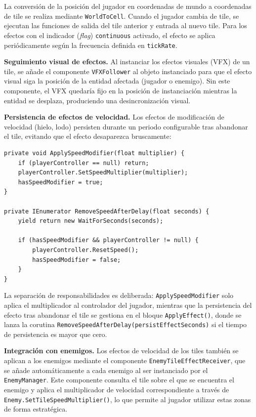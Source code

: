 La conversión de la posición del jugador en coordenadas de mundo a coordenadas de tile se realiza mediante \texttt{WorldToCell}. Cuando el jugador cambia de tile, se ejecutan las funciones de salida del tile anterior y entrada al nuevo tile. Para los efectos con el indicador (\textit{flag}) \texttt{continuous} activado, el efecto se aplica periódicamente según la frecuencia definida en \texttt{tickRate}.

\textbf{Seguimiento visual de efectos.} Al instanciar los efectos visuales (VFX) de un tile, se añade el componente \texttt{VFXFollower} al objeto instanciado para que el efecto visual siga la posición de la entidad afectada (jugador o enemigo). Sin este componente, el VFX quedaría fijo en la posición de instanciación mientras la entidad se desplaza, produciendo una desincronización visual.

\textbf{Persistencia de efectos de velocidad.} Los efectos de modificación de velocidad (hielo, lodo) persisten durante un periodo configurable tras abandonar el tile, evitando que el efecto desaparezca bruscamente:

\begin{lstlisting}
private void ApplySpeedModifier(float multiplier) {
    if (playerController == null) return;
    playerController.SetSpeedMultiplier(multiplier);
    hasSpeedModifier = true;
}

private IEnumerator RemoveSpeedAfterDelay(float seconds) {
    yield return new WaitForSeconds(seconds);
    
    if (hasSpeedModifier && playerController != null) {
        playerController.ResetSpeed();
        hasSpeedModifier = false;
    }
}
\end{lstlisting}


La separación de responsabilidades es deliberada: \texttt{ApplySpeedModifier} solo aplica el multiplicador al controlador del jugador, mientras que la persistencia del efecto tras abandonar el tile se gestiona en el bloque \texttt{ApplyEffect()}, donde se lanza la corutina \texttt{RemoveSpeedAfterDelay(persistEffectSeconds)} si el tiempo de persistencia es mayor que cero.

\textbf{Integración con enemigos.} Los efectos de velocidad de los tiles también se aplican a los enemigos mediante el componente \texttt{EnemyTileEffectReceiver}, que se añade automáticamente a cada enemigo al ser instanciado por el \texttt{EnemyManager}. Este componente consulta el tile sobre el que se encuentra el enemigo y aplica el multiplicador de velocidad correspondiente a través de \texttt{Enemy.SetTileSpeedMultiplier()}, lo que permite al jugador utilizar estas zonas de forma estratégica.

